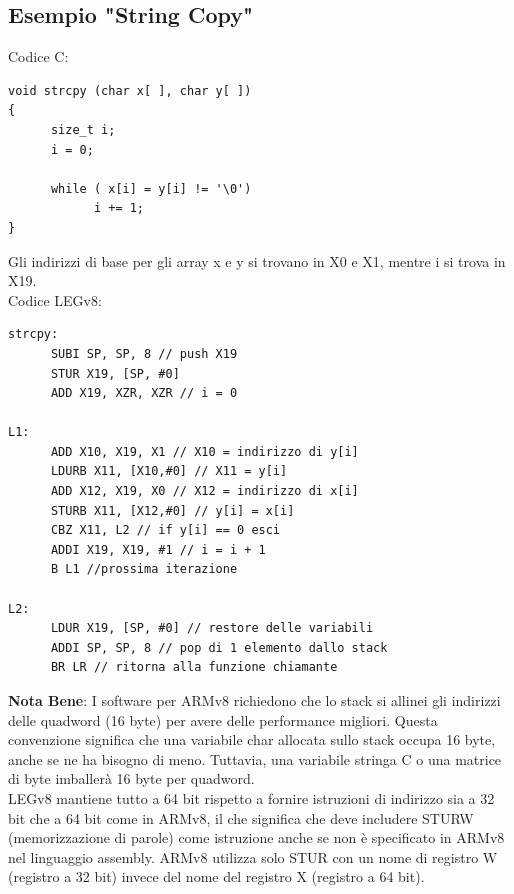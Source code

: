 \documentclass[12pt,a4paper]{article}
\begin{document}
\subsection{Esempio "String Copy"}
Codice C:
\begin{verbatim}
void strcpy (char x[ ], char y[ ])
{
      size_t i;
      i = 0;
      
      while ( x[i] = y[i] != '\0')
            i += 1;
}
\end{verbatim}
Gli indirizzi di base per gli array x e y si trovano in X0 e X1, mentre i si trova in X19.\\
Codice LEGv8:
\begin{verbatim}
strcpy:
      SUBI SP, SP, 8 // push X19
      STUR X19, [SP, #0]
      ADD X19, XZR, XZR // i = 0

L1:
      ADD X10, X19, X1 // X10 = indirizzo di y[i]
      LDURB X11, [X10,#0] // X11 = y[i]
      ADD X12, X19, X0 // X12 = indirizzo di x[i]
      STURB X11, [X12,#0] // y[i] = x[i]
      CBZ X11, L2 // if y[i] == 0 esci
      ADDI X19, X19, #1 // i = i + 1
      B L1 //prossima iterazione

L2:
      LDUR X19, [SP, #0] // restore delle variabili
      ADDI SP, SP, 8 // pop di 1 elemento dallo stack
      BR LR // ritorna alla funzione chiamante
\end{verbatim}
\textbf{Nota Bene}: I software per ARMv8 richiedono che lo stack si allinei gli indirizzi delle quadword (16 byte) per avere delle performance migliori. Questa convenzione significa che una variabile char allocata sullo stack occupa 16 byte, anche se ne ha bisogno di meno. Tuttavia, una variabile stringa C o una matrice di byte imballerà 16 byte per quadword.\\
LEGv8 mantiene tutto a 64 bit rispetto a fornire istruzioni di indirizzo sia a 32 bit che a 64 bit come in ARMv8, il che significa che deve includere STURW (memorizzazione di parole) come istruzione anche se non è specificato in ARMv8 nel linguaggio assembly. ARMv8 utilizza solo STUR con un nome di registro W (registro a 32 bit) invece del nome del registro X (registro a 64 bit).
\end{document}
